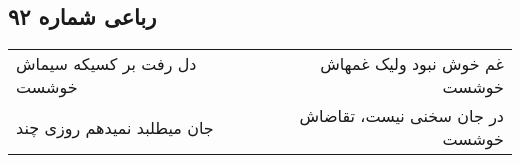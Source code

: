 \begin{center}
\section*{رباعی شماره ۹۲}
\label{sec:sh092}
\begin{longtable}{l p{0.5cm} r}
دل رفت بر کسیکه سیماش خوشست
&&
غم خوش نبود ولیک غمهاش خوشست
\\
جان میطلبد نمیدهم روزی چند
&&
در جان سخنی نیست، تقاضاش خوشست
\\
\end{longtable}
\end{center}
